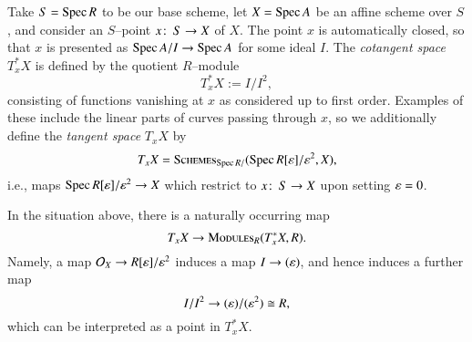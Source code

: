 \begin{definition}\label{DefnOfCoTangentSpaces}
Take $S = \operatorname{Spec} R$ to be our base scheme, let $X = \operatorname{Spec} A$ be an affine scheme over $S$, and consider an $S$--point $x\colon\thinspace S \to X$ of $X$.  The point $x$ is automatically closed, so that $x$ is presented as $\operatorname{Spec} A/I \to \operatorname{Spec} A$ for some ideal $I$.  The \textit{cotangent space} $T^*_x X$ is defined by the quotient $R$--module \[T^*_x X := I / I^2,\] consisting of functions vanishing at $x$ as considered up to first order.  Examples of these include the linear parts of curves passing through $x$, so we additionally define the \textit{tangent space} $T_x X$ by \[T_x X = \normalfont\textsc{Schemes}_{\operatorname{Spec} R/}(\operatorname{Spec} R[\varepsilon] / \varepsilon^2, X),\] i.e., maps $\operatorname{Spec} R[\varepsilon] / \varepsilon^2 \to X$ which restrict to $x\colon\thinspace S \to X$ upon setting $\varepsilon = 0$.
\end{definition}

\begin{remark}
In the situation above, there is a naturally occurring map \[T_x X \to \normalfont\textsc{Modules}_R(T^*_x X, R).\]  Namely, a map $\mathcal{O}_X \to R[\varepsilon] / \varepsilon^2$ induces a map $I \to (\varepsilon)$, and hence induces a further map \[I / I^2 \to (\varepsilon) / (\varepsilon^2) \cong R,\] which can be interpreted as a point in $T^*_x X$.
\end{remark}

